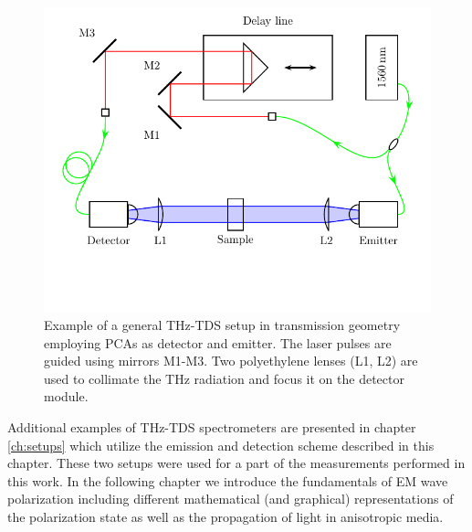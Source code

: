 \begin{figure}[H]
    \centering
    \includegraphics[scale=0.65]{images/TDS/Setup-THz-TDS-SimpleExample.pdf}
    \caption{Example of a general THz-TDS setup in transmission geometry employing PCAs as detector and emitter. The laser pulses are guided using mirrors M1-M3. Two polyethylene lenses (L1, L2) are used to collimate the THz radiation and focus it on the detector module.}
    \label{fig:Setup-THz-TDS-SimpleExample}
\end{figure}

Additional examples of THz-TDS spectrometers are presented in chapter \ref{ch:setups} which utilize the emission and detection scheme described in this chapter. These two setups were used for a part of the measurements performed in this work. In the following chapter we introduce the fundamentals of EM wave polarization including different mathematical (and graphical) representations of the polarization state as well as the propagation of light in anisotropic media.